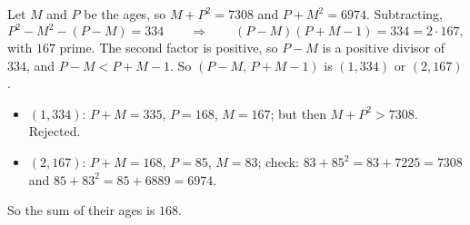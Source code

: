 Let $M$ and $P$ be the ages, so $M+P^2=7308$ and $P+M^2=6974$. Subtracting,
\[
P^2-M^2-(P-M)=334\qquad\Longrightarrow\qquad (P-M)(P+M-1)=334=2\cdot167 ,
\]
with $167$ prime. The second factor is positive, so $P-M$ is a positive divisor of $334$, and $P-M<P+M-1$. So $(P-M,\,P+M-1)$ is $(1,334)$ or $(2,167)$.
\begin{itemize}
\item $(1,334)$: $P+M=335$, $P=168$, $M=167$; but then $M+P^2>7308$. Rejected.
\item $(2,167)$: $P+M=168$, $P=85$, $M=83$; check: $83+85^2=83+7225=7308$ and $85+83^2=85+6889=6974$.
\end{itemize}
So the sum of their ages is $\boxed{168}$.
